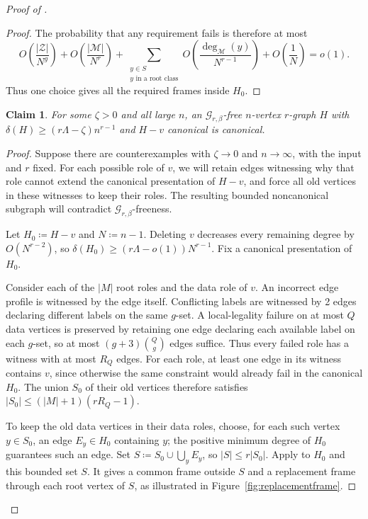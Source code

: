 \documentclass[10pt]{article}
\numberwithin{equation}{section}
\newtheorem{claim}[claim]{Claim}\aliascntresetthe{claim}
\theoremstyle{definition}
\newcommand{\cG}{\mathcal G}\newcommand{\cH}{\mathcal H}\newcommand{\cJ}{\mathcal J}
\begin{document}
\begin{proof}[Proof of ]
\begin{proof}
The probability that any requirement fails is therefore at most
\[
 O\left(\frac{|\mathcal Z|}{N^g}\right)
 +O\left(\frac{|\mathcal M|}{N^r}\right)
 +\sum_{\substack{y\in S\\y\text{ in a root class}}}O\left(\frac{\deg_{\mathcal M}(y)}{N^{r-1}}\right)
 +O\left(\frac1N\right)=o(1).
\]
Thus one choice gives all the required frames inside $H_0$.
\end{proof}

\begin{claim}\label{prop:vertexextend}
For some $\zeta>0$ and all large $n$, an $\cG_{r,\beta}$-free $n$-vertex $r$-graph $H$ with $\delta(H)\ge(r\Lambda-\zeta)n^{r-1}$ and $H-v$ canonical is canonical.
\end{claim}
\begin{proof}
Suppose there are counterexamples with $\zeta\to0$ and $n\to\infty$, with the input and $r$ fixed. For each possible role of $v$, we will retain edges witnessing why that role cannot extend the canonical presentation of $H-v$, and force all old vertices in these witnesses to keep their roles. The resulting bounded noncanonical subgraph will contradict $\cG_{r,\beta}$-freeness.

Let $H_0\coloneqq H-v$ and $N\coloneqq n-1$. Deleting $v$ decreases every remaining degree by $O(N^{r-2})$, so $\delta(H_0)\ge(r\Lambda-o(1))N^{r-1}$. Fix a canonical presentation of $H_0$.

Consider each of the $|M|$ root roles and the data role of $v$. An incorrect edge profile is witnessed by the edge itself. Conflicting labels are witnessed by 2 edges declaring different labels on the same $g$-set. A local-legality failure on at most $Q$ data vertices is preserved by retaining one edge declaring each available label on each $g$-set, so at most $(g+3)\binom Qg$ edges suffice. Thus every failed role has a witness with at most $R_Q$ edges. For each role, at least one edge in its witness contains $v$, since otherwise the same constraint would already fail in the canonical $H_0$. The union $S_0$ of their old vertices therefore satisfies $|S_0|\le(|M|+1)(rR_Q-1)$.

To keep the old data vertices in their data roles, choose, for each such vertex $y\in S_0$, an edge $E_y\in H_0$ containing $y$; the positive minimum degree of $H_0$ guarantees such an edge. Set $S\coloneqq S_0\cup\bigcup_y E_y$, so $|S|\le r|S_0|$. Apply  to $H_0$ and this bounded set $S$. It gives a common frame outside $S$ and a replacement frame through each root vertex of $S$, as illustrated in Figure~\ref{fig:replacementframe}.


\end{proof}
\end{proof}
\end{document}
